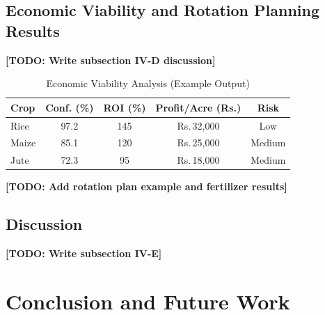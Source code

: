 \documentclass[conference]{IEEEtran}
\begin{document}
\subsection{Economic Viability and Rotation Planning Results}
\textbf{[TODO: Write subsection IV-D discussion]}

\begin{table}[htbp]
\caption{Economic Viability Analysis (Example Output)}
\label{tab:economic}
\centering
\renewcommand{\arraystretch}{1.2}
\begin{tabular}{|l|c|c|c|c|}
\hline
\textbf{Crop} & \textbf{Conf. (\%)} & \textbf{ROI (\%)} & \textbf{Profit/Acre (Rs.)} & \textbf{Risk} \\
\hline
Rice  & 97.2 & 145 & Rs.\,32{,}000 & Low \\
Maize & 85.1 & 120 & Rs.\,25{,}000 & Medium \\
Jute  & 72.3 & 95  & Rs.\,18{,}000 & Medium \\
\hline
\end{tabular}
\end{table}

\textbf{[TODO: Add rotation plan example and fertilizer results]}

\subsection{Discussion}
\textbf{[TODO: Write subsection IV-E]}

\section{Conclusion and Future Work}
\label{sec:conclusion}
\end{document}
